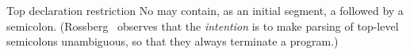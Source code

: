 \begin{comment}{Constraining our deviation}
So our deviation~\zref{deviation:no-redefinitions} from the ``full''
language imposed the constraint that redefinitions are illegal, but we
can ``shadow'' an identifier if it is inside a structure. We see
that the Definition further limits the possible identifiers we can
shadow \emph{in general}.
\end{comment}

\begin{clause}{Top declaration restriction}\label{clause:syntax-modules:top-declaration-restriction}
No  may contain, as an initial segment, a
 followed by a semicolon.
(Rossberg~\cite{rossberg2018defects} observes that the \emph{intention}
is to make parsing of top-level semicolons unambiguous, so that they
always terminate a program.)
\end{clause}

\begin{comment}{Semicolons treated worse than a dead dog}
It seems to me that semicolons are being treated worse than a dead dog,
and it might actually improve the language if every statement and
declaration had to end with a semicolons. Or if semicolons were banned
altogether. It's got to be one or the other, because right now it's this
muddied middle-of-the-road strategy (which is a great way to get hit by
a car).
\end{comment}

\begin{comment}{References on Standard ML syntax}
Scott and Jonstone~\cite{scott2023analysing} have re-examined Standard
ML's syntax using modern lexical tools.
\end{comment}